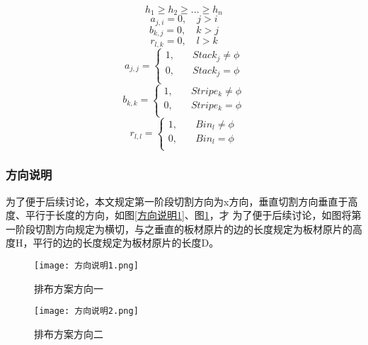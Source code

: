 \documentclass[bwprint]{gmcmthesis}
\begin{document}
\begin{equation}
    h_{1} \ge h_{2} \ge ... \ge h_{n}
\end{equation} 
\begin{equation}
    a_{j,i}=0, \quad   j>i
\end{equation}
\begin{equation}
    b_{k,j}=0, \quad   k>j
\end{equation}
\begin{equation}
    r_{l,k}=0, \quad   l>k
\end{equation}
\begin{equation}
    a_{j,j}=
    \begin{cases}
        1, \quad  & Stack_j \neq  \phi  \\
        0,\quad  & Stack_j  =  \phi  \\
    \end{cases}
\end{equation}
\begin{equation}
    b_{k,k}=
    \begin{cases}
        1, \quad  & Stripe_k \neq  \phi  \\
        0,\quad  & Stripe_k =  \phi  \\
    \end{cases}
\end{equation}
\begin{equation}
    r_{l,l}=
    \begin{cases}
        1, \quad  & Bin_l \neq  \phi  \\
        0,\quad  & Bin_l = \phi  \\
    \end{cases}
\end{equation}

\subsubsection{方向说明}
为了便于后续讨论，本文规定第一阶段切割方向为x方向，垂直切割方向垂直于高度、平行于长度的方向，如图\ref{方向说明1}、图\ref{方向说明2}，才
为了便于后续讨论，如图将第一阶段切割方向规定为横切，与之垂直的板材原片的边的长度规定为板材原片的高度H，平行的边的长度规定为板材原片的长度D。
\begin{figure}[!htbp]
    \centering
    \begin{minipage}{0.48\linewidth}
        \centering
        \texttt{[image: 方向说明1.png]}
        \caption{排布方案方向一}\label{方向说明1}
    \end{minipage}
    \begin{minipage}{0.48\linewidth}
        \centering
        \texttt{[image: 方向说明2.png]}
        \caption{排布方案方向二}\label{方向说明2}
    \end{minipage}
\end{figure}
\end{document}
